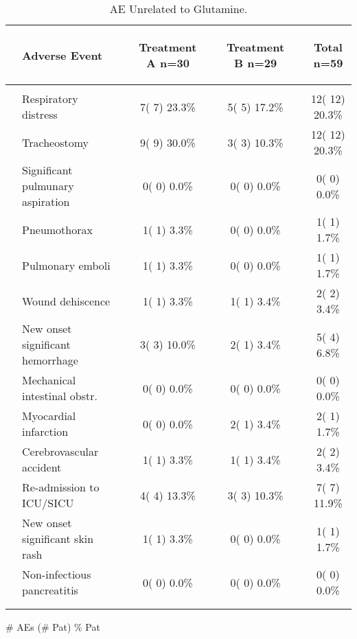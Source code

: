 \documentclass[dvips,10pt]{article}
\begin{document}
\begin{table}[t]
\caption
{ AE Unrelated to Glutamine. }
\begin{center}
\begin{tabular}{ @{}l@{}
@{}l@{}@{}p{1.5em}@{}@{}c@{}@{}p{1.5em}@{}@{}c@{}@{}p{1.5em}@{}@{}c@{}
}
\hline

& \parbox{6em}{\begin{center}Adverse Event\end{center}} && \parbox{6em}{\begin{center}Treatment A n=30\end{center}} && \parbox{6em}{\begin{center}Treatment B n=29\end{center}} && \parbox{6em}{\begin{center}Total n=59\end{center}} \\

\hline

\\
& Respiratory distress && 7(  7) 23.3\% && 5(  5) 17.2\% && 12( 12) 20.3\% \\
& Tracheostomy && 9(  9) 30.0\% && 3(  3) 10.3\% && 12( 12) 20.3\% \\
& Significant pulmunary aspiration && 0(  0)  0.0\% && 0(  0)  0.0\% && 0(  0)  0.0\% \\
& Pneumothorax && 1(  1)  3.3\% && 0(  0)  0.0\% && 1(  1)  1.7\% \\
& Pulmonary emboli && 1(  1)  3.3\% && 0(  0)  0.0\% && 1(  1)  1.7\% \\
& Wound dehiscence && 1(  1)  3.3\% && 1(  1)  3.4\% && 2(  2)  3.4\% \\
& New onset significant hemorrhage && 3(  3) 10.0\% && 2(  1)  3.4\% && 5(  4)  6.8\% \\
& 
Mechanical intestinal obstr. && 0(  0)  0.0\% && 0(  0)  0.0\% && 0(  0)  0.0\% \\
& Myocardial infarction && 0(  0)  0.0\% && 2(  1)  3.4\% && 2(  1)  1.7\% \\
& Cerebrovascular accident && 1(  1)  3.3\% && 1(  1)  3.4\% && 2(  2)  3.4\% \\
& Re-admission to ICU/SICU && 4(  4) 13.3\% && 3(  3) 10.3\% && 7(  7) 11.9\% \\
& New onset significant skin rash && 1(  1)  3.3\% && 0(  0)  0.0\% && 1(  1)  1.7\% \\
& 
Non-infectious pancreatitis && 0(  0)  0.0\% && 0(  0)  0.0\% && 0(  0)  0.0\% \\
\\
\hline \\

\end{tabular}


\parbox{ 5in }{ \# AEs (\# Pat) \% Pat } \\
 \vspace{1em}\end{center}
 \end{table}
\end{document}

